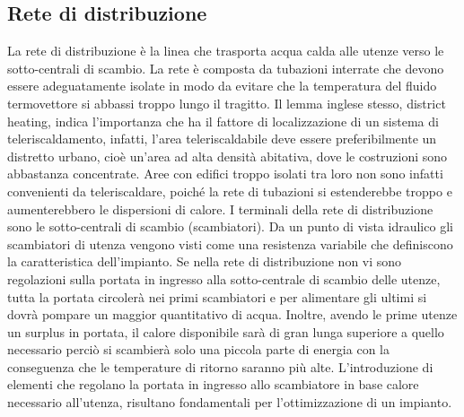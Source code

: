 \documentclass[laurea,oneside,11pt]{USiena_tesiLM}
\begin{document}
%
%
%
%

\subsection{Rete di distribuzione}
La rete di distribuzione è la linea che trasporta acqua calda alle utenze verso le sotto-centrali di scambio. La rete è composta da tubazioni interrate che  devono  essere adeguatamente isolate  in  modo  da  evitare  che  la temperatura  del fluido termovettore si abbassi troppo lungo il tragitto. 
Il  lemma  inglese  stesso,  district  heating,  indica  l'importanza  che  ha  il  fattore  di localizzazione  di un sistema  di  teleriscaldamento, infatti,  l'area  teleriscaldabile  deve  essere  preferibilmente  un distretto  urbano,  cioè  un'area  ad  alta  densità  abitativa,  dove  le  costruzioni  sono abbastanza concentrate.
Aree  con  edifici  troppo  isolati  tra  loro  non  sono  infatti  convenienti  da  teleriscaldare, poiché
la rete di tubazioni si estenderebbe troppo e aumenterebbero le dispersioni di calore.
I terminali della rete di distribuzione sono le sotto-centrali di scambio (scambiatori). Da un punto di vista idraulico gli scambiatori di utenza vengono visti come una resistenza variabile che definiscono la caratteristica dell'impianto. 
Se nella rete di distribuzione non vi sono regolazioni sulla portata in ingresso alla sotto-centrale di scambio delle utenze, tutta la portata circolerà nei primi scambiatori e per alimentare gli ultimi si dovrà pompare un maggior quantitativo di acqua. Inoltre, avendo le prime utenze un surplus in portata, il calore disponibile sarà di gran lunga superiore a quello necessario perciò si scambierà solo una piccola parte di energia con la conseguenza che le temperature di ritorno saranno più alte.
L'introduzione di elementi che regolano la portata in ingresso allo scambiatore in base calore necessario all'utenza, risultano fondamentali per l'ottimizzazione di un impianto. 
\end{document}
